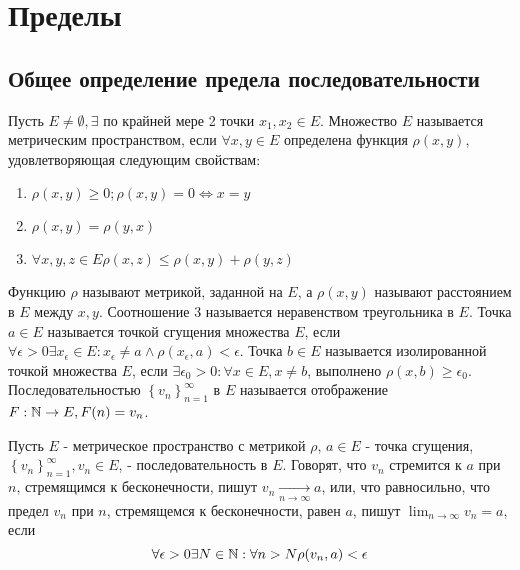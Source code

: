 \documentclass[main]{subfiles}
\begin{document}
\chapter{Пределы}

\section{Общее определение предела последовательности}
\begin{definition}
    Пусть $E \neq \emptyset, \exists$ по крайней мере 2 точки $x_1, x_2 \in E$.
    Множество $E$ называется метрическим пространством, если $\forall x, y 
    \in E$ определена функция $\rho(x, y)$, удовлетворяющая следующим 
    свойствам:
    \begin{enumerate}
        \item $\rho(x, y) \geq 0; \rho(x, y) = 0 \Leftrightarrow x = y$
        \item $\rho(x, y) = \rho(y, x)$
        \item $\forall x, y, z \in E \rho(x, z) \leq \rho(x, y) + \rho(y, z)$
    \end{enumerate}
    Функцию $\rho$ называют метрикой, заданной на $E$, а $\rho(x, y)$ называют 
    расстоянием в $E$ между $x, y$. Соотношение 3 называется неравенством
    треугольника в $E$. Точка $a \in E$ называется точкой сгущения множества
    $E$, если $\forall \epsilon > 0 \exists x_\epsilon \in E : x_\epsilon 
    \neq a \wedge \rho(x_\epsilon, a) < \epsilon$. Точка $b \in E$ называется
    изолированной точкой множества $E$, если $\exists \epsilon_0 > 0 : 
    \forall x \in E, x \neq b$, выполнено $\rho(x, b) \geq \epsilon_0$.
    Последовательностью $\left\{v_n\right\}_{n = 1}^{\infty}$ в $E$ 
    называется отображение $F: \mathbb{N} \rightarrow E, F(n) = v_n$.
\end{definition}

\begin{definition}
    Пусть $E$ - метрическое пространство с метрикой $\rho$, $a \in E$ - 
    точка сгущения, $\left\{v_n\right\}_{n = 1}^{\infty}, v_n \in E$, - 
    последовательность в $E$. Говорят, что $v_n$ стремится к $a$ при $n$, 
    стремящимся к бесконечности, пишут $v_n 
    \underset{n \rightarrow \infty}{\to} a$, или, что равносильно, что предел 
    $v_n$ при $n$, стремящемся к бесконечности, равен $a$, пишут 
    $\lim_{n\to\infty}v_n = a$, если 
    \begin{equation}\label{limdef}
        \forall \epsilon > 0 \exists N \in \mathbb{N} :
        \forall n > N \rho(v_n, a) < \epsilon
    \end{equation}
\end{definition}
\end{document}

